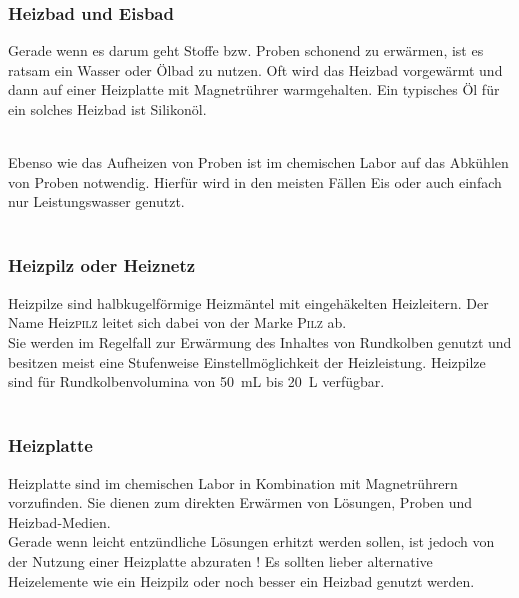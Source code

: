 \subsubsection*{Heizbad und Eisbad}
Gerade wenn es darum geht Stoffe bzw. Proben schonend zu erwärmen, ist es ratsam ein Wasser oder Ölbad zu nutzen. Oft wird das Heizbad vorgewärmt und dann auf einer Heizplatte mit Magnetrührer warmgehalten. Ein typisches Öl für ein solches Heizbad ist Silikonöl.\\

\\

\vspace*{7mm}

Ebenso wie das Aufheizen von Proben ist im chemischen Labor auf das Abkühlen von Proben notwendig. Hierfür wird in den meisten Fällen Eis oder auch einfach nur Leistungswasser genutzt.\\

\\

\subsubsection*{Heizpilz oder Heiznetz}
Heizpilze sind halbkugelförmige Heizmäntel mit eingehäkelten Heizleitern. Der Name Heiz\textsc{pilz} leitet sich dabei von der Marke \textsc{Pilz} ab.\\
Sie werden im Regelfall zur Erwärmung des Inhaltes von Rundkolben genutzt und besitzen meist eine Stufenweise Einstellmöglichkeit der Heizleistung. Heizpilze sind für Rundkolbenvolumina von \SI{50}{\milli \liter} bis \SI{20}{\liter} verfügbar.\\

\\

\subsubsection*{Heizplatte}
Heizplatte sind im chemischen Labor in Kombination mit Magnetrührern vorzufinden. Sie dienen zum direkten Erwärmen von Lösungen, Proben und Heizbad-Medien. \\
Gerade wenn leicht entzündliche Lösungen erhitzt werden sollen, ist jedoch von der Nutzung einer Heizplatte abzuraten ! Es sollten lieber alternative Heizelemente wie ein Heizpilz oder noch besser ein Heizbad genutzt werden.


